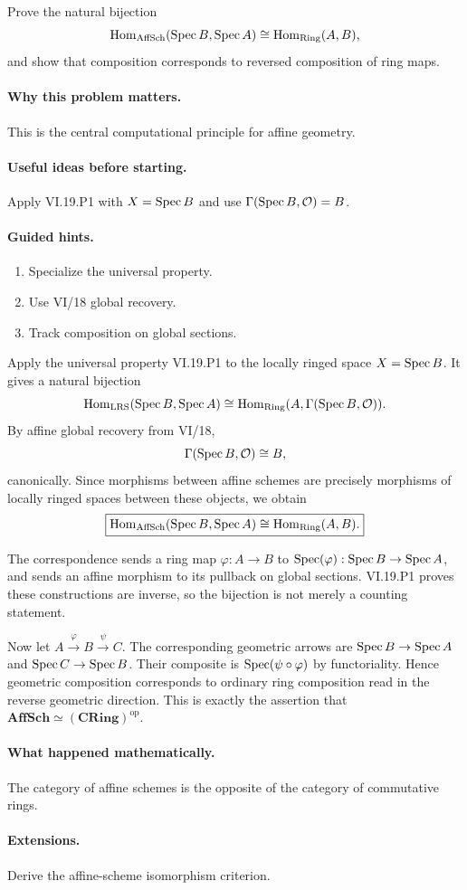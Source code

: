 \begin{problem}\label{prob:vi19-p04}
Prove the natural bijection
\[
\operatorname{Hom}_{\mathrm{AffSch}}(\operatorname{Spec} B,\operatorname{Spec} A)
\cong
\operatorname{Hom}_{\mathrm{Ring}}(A,B),
\]
and show that composition corresponds to reversed composition of ring maps.
\end{problem}

\ifdefined\FullProblemDossiers
\paragraph{Why this problem matters.}
This is the central computational principle for affine geometry.

\paragraph{Useful ideas before starting.}
Apply VI.19.P1 with $X=\operatorname{Spec} B$ and use $\Gamma(\operatorname{Spec} B,\mathcal O)=B$.

\paragraph{Guided hints.}
\begin{enumerate}
\item Specialize the universal property.
\item Use VI/18 global recovery.
\item Track composition on global sections.
\end{enumerate}

\begin{solution}
Apply the universal property VI.19.P1 to the locally ringed space \(X=\operatorname{Spec} B\).  It gives a natural bijection
\[
\operatorname{Hom}_{\mathrm{LRS}}(\operatorname{Spec} B,\operatorname{Spec} A)
\cong
\operatorname{Hom}_{\mathrm{Ring}}(A,\Gamma(\operatorname{Spec} B,\mathcal O)).
\]
By affine global recovery from VI/18,
\[
\Gamma(\operatorname{Spec} B,\mathcal O)\cong B,
\]
canonically.  Since morphisms between affine schemes are precisely morphisms of locally ringed spaces between these objects, we obtain
\[
\boxed{
\operatorname{Hom}_{\mathrm{AffSch}}(\operatorname{Spec} B,\operatorname{Spec} A)
\cong
\operatorname{Hom}_{\mathrm{Ring}}(A,B).}
\]

The correspondence sends a ring map \(\varphi:A\to B\) to \(\operatorname{Spec}(\varphi):\operatorname{Spec} B\to\operatorname{Spec} A\), and sends an affine morphism to its pullback on global sections.  VI.19.P1 proves these constructions are inverse, so the bijection is not merely a counting statement.

Now let \(A\xrightarrow{\varphi}B\xrightarrow{\psi}C\).  The corresponding geometric arrows are \(\operatorname{Spec} B\to\operatorname{Spec} A\) and \(\operatorname{Spec} C\to\operatorname{Spec} B\).  Their composite is \(\operatorname{Spec}(\psi\circ\varphi)\) by functoriality.  Hence geometric composition corresponds to ordinary ring composition read in the reverse geometric direction.  This is exactly the assertion that \(\mathbf{AffSch}\simeq(\mathbf{CRing})^{\mathrm{op}}\).
\end{solution}

\paragraph{What happened mathematically.}
The category of affine schemes is the opposite of the category of commutative rings.

\paragraph{Extensions.}
Derive the affine-scheme isomorphism criterion.
\fi
